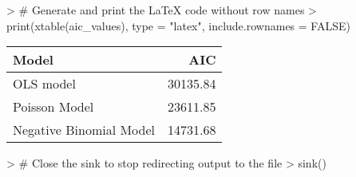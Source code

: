 
> # Generate and print the LaTeX code without row names
> print(xtable(aic_values), type = "latex", include.rownames = FALSE)
\begin{table}[ht]
\centering
\begin{tabular}{lr}
  \hline
Model & AIC \\ 
  \hline
OLS model & 30135.84 \\ 
  Poisson Model & 23611.85 \\ 
  Negative Binomial Model & 14731.68 \\ 
   \hline
\end{tabular}
\end{table}

> # Close the sink to stop redirecting output to the file
> sink()
